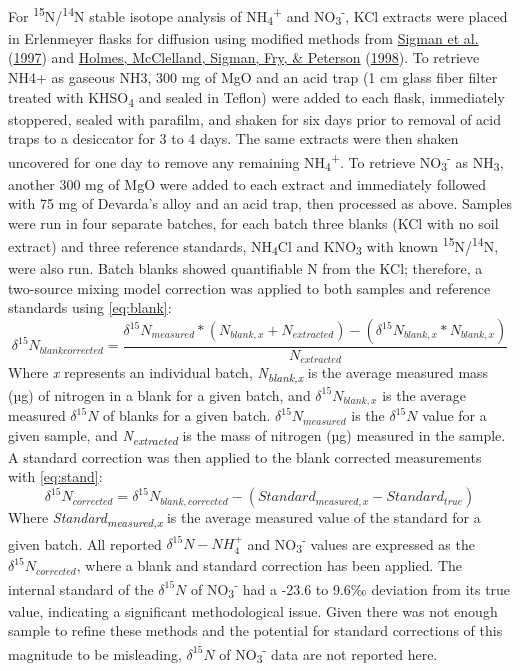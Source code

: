 \documentclass [11pt, proquest] {uwthesis}[2015/03/03]
\begin{document}
For \textsuperscript{15}N/\textsuperscript{14}N stable isotope analysis of NH\textsubscript{4}\textsuperscript{+} and NO\textsubscript{3}\textsuperscript{-}, KCl extracts were placed in Erlenmeyer flasks for diffusion using modified methods from \protect\hyperlink{ref-Sigman1997}{Sigman et al.} (\protect\hyperlink{ref-Sigman1997}{1997}) and \protect\hyperlink{ref-Holmes1998}{Holmes, McClelland, Sigman, Fry, \& Peterson} (\protect\hyperlink{ref-Holmes1998}{1998}). To retrieve NH4+ as gaseous NH3, 300 mg of MgO and an acid trap (1 cm glass fiber filter treated with KHSO\textsubscript{4} and sealed in Teflon) were added to each flask, immediately stoppered, sealed with parafilm, and shaken for six days prior to removal of acid traps to a desiccator for 3 to 4 days. The same extracts were then shaken uncovered for one day to remove any remaining NH\textsubscript{4}\textsuperscript{+}. To retrieve NO\textsubscript{3}\textsuperscript{-} as NH\textsubscript{3}, another 300 mg of MgO were added to each extract and immediately followed with 75 mg of Devarda's alloy and an acid trap, then processed as above. Samples were run in four separate batches, for each batch three blanks (KCl with no soil extract) and three reference standards, NH\textsubscript{4}Cl and KNO\textsubscript{3} with known \textsuperscript{15}N/\textsuperscript{14}N, were also run. Batch blanks showed quantifiable N from the KCl; therefore, a two-source mixing model correction was applied to both samples and reference standards using \eqref{eq:blank}:
\begin{equation} 
  \delta^{15}N_{blank corrected} =   \frac{\delta^{15}N_{measured}*(N_{blank,x} + N_{extracted}) - (\delta^{15}N_{blank,x}*N_{blank,x})}{N_{extracted}}
  \label{eq:blank}
\end{equation}
Where \emph{x} represents an individual batch, \emph{N\textsubscript{blank,x}} is the average measured mass (µg) of nitrogen in a blank for a given batch, and \(\delta^{15}N_{blank,x}\) is the average measured \(\delta^{15}N\) of blanks for a given batch. \(\delta^{15}N_{measured}\) is the \(\delta^{15}N\) value for a given sample, and \emph{N\textsubscript{extracted}} is the mass of nitrogen (µg) measured in the sample. A standard correction was then applied to the blank corrected measurements with \eqref{eq:stand}:
\begin{equation} 
  \delta^{15}N_{corrected} =   \delta^{15}N_{blank,corrected}-(Standard_{measured,x} - Standard_{true})
  \label{eq:stand}
\end{equation}
Where \emph{Standard\textsubscript{measured,x}} is the average measured value of the standard for a given batch. All reported \(\delta^{15}N-NH_4^+\) and NO\textsubscript{3}\textsuperscript{-} values are expressed as the \(\delta^{15}N_{corrected}\), where a blank and standard correction has been applied. The internal standard of the \(\delta^{15}N\) of NO\textsubscript{3}\textsuperscript{-} had a -23.6 to 9.6‰ deviation from its true value, indicating a significant methodological issue. Given there was not enough sample to refine these methods and the potential for standard corrections of this magnitude to be misleading, \(\delta^{15}N\) of NO\textsubscript{3}\textsuperscript{-} data are not reported here.
\end{document}
